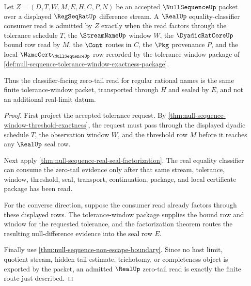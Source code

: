 \begin{theorem}
\label{thm:null-sequence-zero-tail-criterion}
Let $Z=(D,T,W,M,E,H,C,P,N)$ be an accepted $\NullSequenceUp$ packet over a displayed $\RegSeqRatUp$ difference stream. A $\RealUp$ equality-classifier consumer read is admitted by $Z$ exactly when the read factors through the tolerance schedule $T$, the $\StreamNameUp$ window $W$, the $\DyadicRatCoreUp$ bound row read by $M$, the $\Cont$ routes in $C$, the $\Pkg$ provenance $P$, and the local $\NameCert_{\NullSequenceUp}$ row recorded by the tolerance-window package of \autoref{def:null-sequence-tolerance-window-exactness-package}.

Thus the classifier-facing zero-tail read for regular rational names is the same finite tolerance-window packet, transported through $H$ and sealed by $E$, and not an additional real-limit datum.
\end{theorem}
\begin{proof}
First project the accepted tolerance request. By \autoref{thm:null-sequence-window-threshold-exactness}, the request must pass through the displayed dyadic schedule $T$, the observation window $W$, and the threshold row $M$ before it reaches any $\RealUp$ seal row.

Next apply \autoref{thm:null-sequence-real-seal-factorization}. The real equality classifier can consume the zero-tail evidence only after that same stream, tolerance, window, threshold, seal, transport, continuation, package, and local certificate package has been read.

For the converse direction, suppose the consumer read already factors through these displayed rows. The tolerance-window package supplies the bound row and window for the requested tolerance, and the factorization theorem routes the resulting null-difference evidence into the seal row $E$.

Finally use \autoref{thm:null-sequence-non-escape-boundary}. Since no host limit, quotient stream, hidden tail estimate, trichotomy, or completeness object is exported by the packet, an admitted $\RealUp$ zero-tail read is exactly the finite route just described.
\end{proof}


